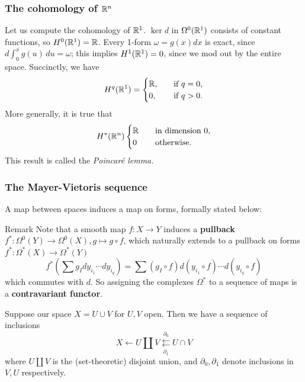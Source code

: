 \documentclass[xcolor=dvipsnames]{beamer}
\begin{document}
\begin{frame}
    \frametitle{The cohomology of $\mathbb{R}^n $} 
    \begin{example}
        Let us compute the cohomology of $\mathbb{R}^1$. $\ker d$ in $\Omega^0(\mathbb{R}^1)$ consists of constant functions, so $H^0(\mathbb{R}^1)=\mathbb{R}$. Every 1-form $\omega=g(x)dx$ is exact, since $d \int_{0}^{x} g(u) \, du=\omega$; this implies $H^1(\mathbb{R}^1)=0$, since we mod out by the entire space. Succinctly, we have
        \[
            H^q(\mathbb{R}^1)=\begin{cases}
                \mathbb{R},\quad &\text{if} \ q=0,\\
                0,& \text{if} \ q>0.
        \end{cases}
        \] More generally, it is true that
        \[
            H^*(\mathbb{R}^n )\begin{cases}
            \mathbb{R} \quad & \text{in dimension} \ 0,\\
            0 & \text{otherwise.}
        \end{cases}
        \] This result is called the \emph{Poincar\'e lemma.} 
    \end{example}%
\end{frame}

\begingroup
\small
\begin{frame}
    \frametitle{The Mayer-Vietoris sequence} 
    A map between spaces induces a map on forms, formally stated below:
    \begin{block}{Remark}
        Note that a smooth map $f \colon X \to Y$ induces a \textbf{pullback} $f^* \colon \Omega^0(Y)\to \Omega^0(X), g \mapsto g \circ f$, which naturally extends to a pullback on forms $f^* \colon \Omega^*(X) \to \Omega^*(Y)$ \[
            f^*\left( \sum g_I dy_{i_1}\cdots dy_{i_q} \right) =\sum \left( g_I \circ f \right) d(y_{i_1}\circ f)\cdots d(y_{i_q}\circ f)
        \] which commutes with $d$. So assigning the complexes $\Omega^*$ to a sequence of maps is a \textbf{contravariant functor}.
    \end{block}%
Suppose our space $X=U \cup V$ for $U,V$ open. Then we have a sequence of inclusions \[
X \leftarrow U \amalg V \underset{\partial_1 }{\overset{\partial_0}{\leftleftarrows}}  U \cap V
\] where $U\amalg V$ is the (set-theoretic) disjoint union, and $\partial _0,\partial_1 $ denote inclusions in $V,U$ respectively.
\end{frame}
\end{document}
